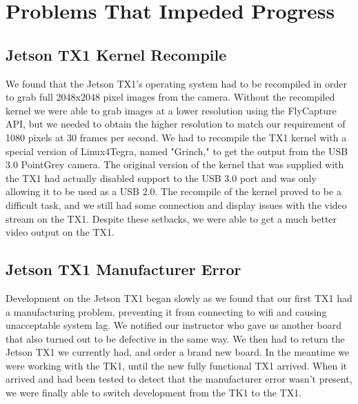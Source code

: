 \documentclass[letterpaper,10pt,titlepage]{IEEEtran}
\begin{document}
\section{Problems That Impeded Progress}
   
   \subsection{Jetson TX1 Kernel Recompile}
   We found that the Jetson TX1's operating system had to be recompiled in order to grab full 2048x2048 pixel images from the camera. Without the recompiled kernel we were able to grab images at a lower resolution using the FlyCapture API, but we needed to obtain the higher resolution to match our requirement of 1080 pixels at 30 frames per second. We had to recompile the TX1 kernel with a special version of Linux4Tegra, named "Grinch," to get the output from the USB 3.0 PointGrey camera. The original version of the kernel that was supplied with the TX1 had actually disabled support to the USB 3.0 port and was only allowing it to be used as a USB 2.0. The recompile of the kernel proved to be a difficult task, and we still had some connection and display issues with the video stream on the TX1. Despite these setbacks, we were able to get a much better video output on the TX1.
   
   \subsection{Jetson TX1 Manufacturer Error}
   Development on the Jetson TX1 began slowly as we found that our first TX1 had a manufacturing problem, preventing it from connecting to wifi and causing unacceptable system lag. We notified our instructor who gave us another board that also turned out to be defective in the same way. We then had to return the Jetson TX1 we currently had, and order a brand new board. In the meantime we were working with the TK1, until the new fully functional TX1 arrived. When it arrived and had been tested to detect that the manufacturer error wasn't present, we were finally able to switch development from the TK1 to the TX1.
   
\end{document}
